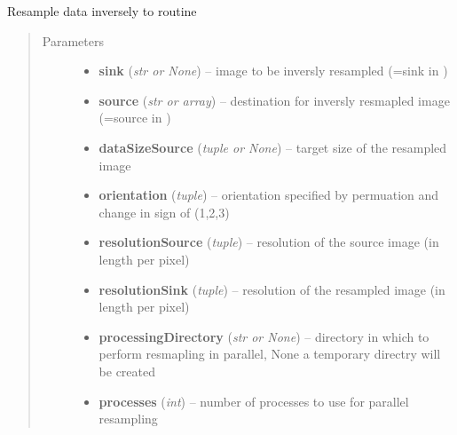 \documentclass[letterpaper,10pt,english]{sphinxmanual}
\begin{document}
\begin{fulllineitems}
\label{api/ClearMap.Alignment:ClearMap.Alignment.Resampling.resampleDataInverse}
Resample data inversely to {\hyperref[api/ClearMap.Alignment:ClearMap.Alignment.Resampling.resampleData]{\emph{}}} routine
\begin{quote}\begin{description}
\item[{Parameters}] \leavevmode\begin{itemize}
\item {} 
\textbf{sink} (\emph{str or None}) --
image to be inversly resampled (=sink in {\hyperref[api/ClearMap.Alignment:ClearMap.Alignment.Resampling.resampleData]{\emph{}}})

\item {} 
\textbf{source} (\emph{str or array}) --
destination for inversly resmapled image (=source in {\hyperref[api/ClearMap.Alignment:ClearMap.Alignment.Resampling.resampleData]{\emph{}}})

\item {} 
\textbf{dataSizeSource} (\emph{tuple or None}) --
target size of the resampled image

\item {} 
\textbf{orientation} (\emph{tuple}) --
orientation specified by permuation and change in sign of (1,2,3)

\item {} 
\textbf{resolutionSource} (\emph{tuple}) --
resolution of the source image (in length per pixel)

\item {} 
\textbf{resolutionSink} (\emph{tuple}) --
resolution of the resampled image (in length per pixel)

\item {} 
\textbf{processingDirectory} (\emph{str or None}) --
directory in which to perform resmapling in parallel, None a temporary directry will be created

\item {} 
\textbf{processes} (\emph{int}) --
number of processes to use for parallel resampling


\end{itemize}
\end{description}
\end{quote}
\end{fulllineitems}
\end{document}
